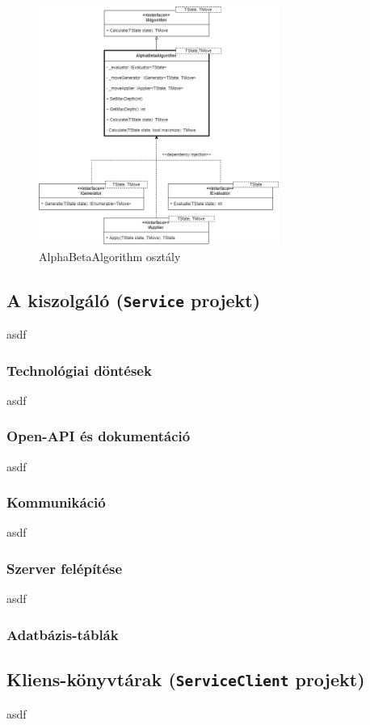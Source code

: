 \documentclass[twoside, a4paper, 12pt]{article}
\begin{document}
\begin{figure}[htbp]
	\centering
	\includegraphics[width=0.7\textwidth]{img/alphabetaAbstractDiagram.png}
	\caption{AlphaBetaAlgorithm osztály}
	\label{fig:alphaBetaAbstractDiagram}
\end{figure}
 
\subsection{ A kiszolgáló (\texttt{Service} projekt)}
asdf
\subsubsection{Technológiai döntések}
asdf
\subsubsection{Open-API és dokumentáció}
asdf
\subsubsection{Kommunikáció}
asdf
\subsubsection{Szerver felépítése}
asdf
\subsubsection{Adatbázis-táblák}

\subsection{Kliens-könyvtárak (\texttt{ServiceClient} projekt)}
asdf
\end{document}
